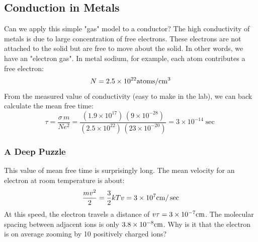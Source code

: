\subsection{Conduction in Metals}
Can we apply this simple "gas" model to a conductor?  The  high conductivity of metals is due to large concentration of free electrons.   These electrons are not attached to the solid but are free to move about the solid.  In other words, we have an "electron gas".   In metal sodium, for example,  each atom contributes a free electron: 
    \[
        N = 2.5 \times {10^{22}}{\rm{atoms/c}}{{\rm{m}}^{\rm{3}}}
    \]
From the measured value of conductivity (easy to make in the lab), we can back calculate the mean free time:
    \begin{equation}
        \tau  = \frac{{\sigma \,m}}{{N{e^2}}} = \frac{{\left( {1.9 \times {{10}^{17}}} \right)\,\left( {9 \times {{10}^{ - 28}}} \right)}}{{\left( {2.5 \times {{10}^{22}}} \right)\,\left( {23 \times {{10}^{ - 20}}} \right)}} = 3 \times {10^{ - 14}}\sec
    \end{equation}
\subsubsection{A Deep Puzzle}
This value of mean free time is surprisingly long.  The mean velocity for an electron at room temperature is about: 
    \begin{equation}
        \frac{{m{v^2}}}{2} = \frac{3}{2}kT  v = 3 \times {10^7}{\rm{cm}}/\sec
    \end{equation}
At this speed, the electron travels a distance of $v\tau  = 3 \times {10^{ - 7}}{\rm{cm}}$.  The molecular spacing between adjacent ions is only $3.8 \times {10^{ - 8}}{\rm{cm}}$.  Why is it that the electron is on average zooming by 10 positively charged ions?
